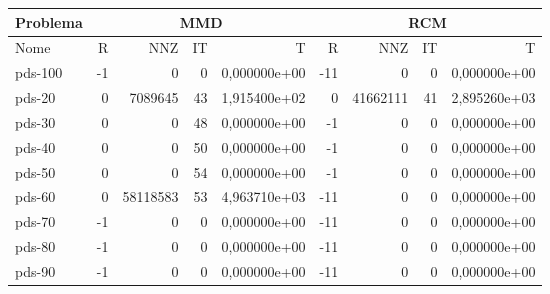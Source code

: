 \begin{tabular}{|l|r|r|r|r|r|r|r|r|}
\hline
\multicolumn{1}{|c|}{Problema} & \multicolumn{4}{|c|}{MMD} &         \multicolumn{4}{|c|}{RCM} \\ \hline
Nome & R & NNZ & IT & T & R & NNZ & IT & T \\ \hline
pds-100 & -1 & 0 & 0 & 0,000000e+00 & -11 & 0 & 0 & 0,000000e+00 \\ \hline
pds-20 & 0 & 7089645 & 43 & 1,915400e+02 & 0 & 41662111 & 41 & 2,895260e+03 \\ \hline
pds-30 & 0 & 0 & 48 & 0,000000e+00 & -1 & 0 & 0 & 0,000000e+00 \\ \hline
pds-40 & 0 & 0 & 50 & 0,000000e+00 & -1 & 0 & 0 & 0,000000e+00 \\ \hline
pds-50 & 0 & 0 & 54 & 0,000000e+00 & -1 & 0 & 0 & 0,000000e+00 \\ \hline
pds-60 & 0 & 58118583 & 53 & 4,963710e+03 & -11 & 0 & 0 & 0,000000e+00 \\ \hline
pds-70 & -1 & 0 & 0 & 0,000000e+00 & -11 & 0 & 0 & 0,000000e+00 \\ \hline
pds-80 & -1 & 0 & 0 & 0,000000e+00 & -11 & 0 & 0 & 0,000000e+00 \\ \hline
pds-90 & -1 & 0 & 0 & 0,000000e+00 & -11 & 0 & 0 & 0,000000e+00 \\ \hline
\end{tabular}
